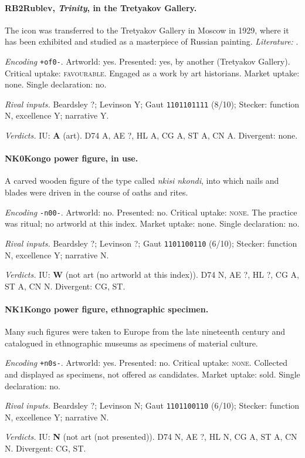 \paragraph{RB2\enspace Rublev, \emph{Trinity}, in the Tretyakov Gallery.}
The icon was transferred to the Tretyakov Gallery in Moscow in 1929, where it has been exhibited and studied as a masterpiece of Russian painting. \textit{Literature:} \citet{Belting1994}.\par
\noindent\textit{Encoding} \texttt{+of0-}. Artworld: yes. Presented: yes, by another (Tretyakov Gallery). Critical uptake: \textsc{favourable}. Engaged as a work by art historians. Market uptake: none. Single declaration: no.\par
\noindent\textit{Rival inputs.} Beardsley ?; Levinson Y; Gaut \texttt{1101101111} (8/10); Stecker: function N, excellence Y; narrative Y.\par
\noindent\textit{Verdicts.} IU: \textbf{A} (art). D74 A, AE ?, HL A, CG A, ST A, CN A. Divergent: none.\par

\paragraph{NK0\enspace Kongo power figure, in use.}
A carved wooden figure of the type called \emph{nkisi nkondi}, into which nails and blades were driven in the course of oaths and rites.\par
\noindent\textit{Encoding} \texttt{-n00-}. Artworld: no. Presented: no. Critical uptake: \textsc{none}. The practice was ritual; no artworld at this index. Market uptake: none. Single declaration: no.\par
\noindent\textit{Rival inputs.} Beardsley ?; Levinson ?; Gaut \texttt{1101100110} (6/10); Stecker: function N, excellence Y; narrative N.\par
\noindent\textit{Verdicts.} IU: \textbf{W} (not art (no artworld at this index)). D74 N, AE ?, HL ?, CG A, ST A, CN N. Divergent: CG, ST.\par

\paragraph{NK1\enspace Kongo power figure, ethnographic specimen.}
Many such figures were taken to Europe from the late nineteenth century and catalogued in ethnographic museums as specimens of material culture.\par
\noindent\textit{Encoding} \texttt{+n0s-}. Artworld: yes. Presented: no. Critical uptake: \textsc{none}. Collected and displayed as specimens, not offered as candidates. Market uptake: sold. Single declaration: no.\par
\noindent\textit{Rival inputs.} Beardsley ?; Levinson N; Gaut \texttt{1101100110} (6/10); Stecker: function N, excellence Y; narrative N.\par
\noindent\textit{Verdicts.} IU: \textbf{N} (not art (not presented)). D74 N, AE ?, HL N, CG A, ST A, CN N. Divergent: CG, ST.\par

